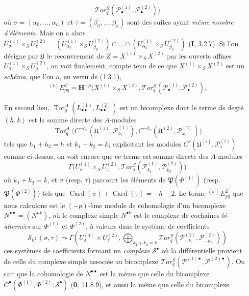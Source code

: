 \begin{env}[6.6.4]
\[    \mathscr{T}\!or_q^S
    (\mathscr P_\bullet^{(1)},\mathscr P_\bullet^{(2)})\bigr)
\]
où $\sigma=(\alpha_0,\ldots,\alpha_h)$ et
$\tau=(\beta_0,\ldots,\beta_h)$ sont des suites ayant \emph{même nombre d'éléments}.
Mais on a alors
$U_\sigma^{(1)}\times_S U_\tau^{(2)}
=(U_{\alpha_0}^{(1)}\times_S U_{\beta_0}^{(2)})\cap\ldots\cap
(U_{\alpha_h}^{(1)}\times_S U_{\beta_h}^{(2)})$
(\textbf{I}, 3.2.7).
Si l'on désigne par $\mathfrak U$ le recouvrement de
$Z=X^{(1)}\times_S X^{(2)}$ par les ouverts affines
$U_\alpha^{(1)}\times_S U_\beta^{(2)}$, on voit finalement, compte tenu de ce
que $X^{(1)}\times_S X^{(2)}$ est un \emph{schéma}, que l'on a, en vertu de (1.3.1),
\[
  {}^{(b)}E_{pq}^2
  =\mathbf H^{-p}(X^{(1)}\times_S X^{(2)},
    \mathscr{T}\!or_q^S
    (\mathscr P_\bullet^{(1)},\mathscr P_\bullet^{(2)}).
\]

En second lieu,
$\operatorname{Tor}_q^A(L_{\bullet\bullet}^{(1)},L_{\bullet\bullet}^{(2)})$ est un
bicomplexe dont le terme de degré $(h,k)$ est la somme directe des $A$-modules
\[
  \operatorname{Tor}_q^A
  \bigl(C^{-h_1}(\mathfrak U^{(1)},\mathscr P_{k_1}^{(1)}),
        C^{-h_2}(\mathfrak U^{(2)},\mathscr P_{k_2}^{(2)})\bigr)
\]
tels que $h_1+h_2=h$ et $k_1+k_2=k$; explicitant les modules
$C^r(\mathfrak U^{(i)},\mathscr P_s^{(i)})$ comme ci-dessus, on voit encore
que ce terme est somme directe des $A$-modules
\[
  \Gamma\bigl(U_\sigma^{(1)}\times_S U_\tau^{(2)},
    \mathscr{T}\!or_q^S
    (\mathscr P_{k_1}^{(1)},\mathscr P_{k_2}^{(2)})\bigr)
\]
où $k_1+k_2=k$, et $\sigma$ (resp. $\tau$) parcourt les éléments de
$\mathfrak P(\Phi^{(1)})$ (resp. $\mathfrak P(\Phi^{(2)})$) tels que
$\operatorname{Card}(\sigma)+\operatorname{Card}(\tau)=-h-2$. Le terme
${}^{(b')}E_{pq}^2$ que nous calculons est le $(-p)$-ème module de
cohomologie d'un bicomplexe $N^{\bullet\bullet}=(N^{hk})$, où le complexe
simple $N^{\bullet k}$ est le complexe de cochaînes \emph{bi-alternées} sur
$\Phi^{(1)}$ et $\Phi^{(2)}$, à valeurs dans le système de coefficients
\[
  \mathscr S_k:(\sigma,\tau)\leadsto
  \Gamma\left(U_\sigma^{(1)}\times U_\tau^{(2)},
    \bigoplus_{k_1+k_2=k}
    \mathscr{T}\!or_q^S
    (\mathscr P_{-k_1}^{(1)},\mathscr P_{-k_2}^{(2)})\right)
\]
ces systèmes de coefficients formant un \emph{complexe} $\mathscr S^\bullet$ où la
différentielle provient de celle du complexe simple associée au bicomplexe
$\mathscr{T}\!or_q^S
(\mathscr P^{(1)\bullet},\mathscr P^{(2)\bullet})$. On sait que la
cohomologie de $N^{\bullet\bullet}$ est la même que celle du bicomplexe
$C^\bullet(\Phi^{(1)},\Phi^{(2)};\mathscr S^\bullet)$
(\textbf{0}, 11.8.9), et aussi la même que celle du bicomplexe

\end{env}
